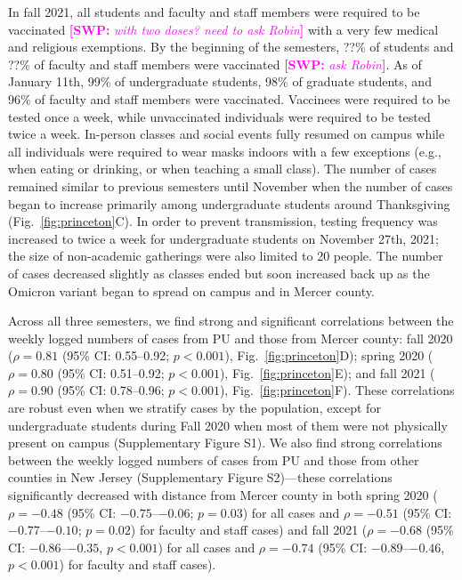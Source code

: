 \documentclass[12pt]{article}
\newcommand{\fref}[1]{Fig.~\ref{fig:#1}}
\newcommand{\comment}[3]{\textcolor{#1}{\textbf{[#2: }\textsl{#3}\textbf{]}}}
\newcommand{\swp}[1]{\comment{magenta}{SWP}{#1}}
\begin{document}
In fall 2021, all students and faculty and staff members were required to be vaccinated \swp{with two doses? need to ask Robin} with a very few medical and religious exemptions.
By the beginning of the semesters, ??\% of students and ??\% of faculty and staff members were vaccinated \swp{ask Robin}.
As of January 11th, 99\% of undergraduate students, 98\% of graduate students, and 96\% of faculty and staff members were vaccinated.
Vaccinees were required to be tested once a week, while unvaccinated individuals were required to be tested twice a week.
In-person classes and social events fully resumed on campus while all individuals were required to wear masks indoors with a few exceptions (e.g., when eating or drinking, or when teaching a small class).
The number of cases remained similar to previous semesters until November when the number of cases began to increase primarily among undergraduate students around Thanksgiving (\fref{princeton}C).  
In order to prevent transmission, testing frequency was increased to twice a week for undergraduate students on November 27th, 2021; the size of non-academic gatherings were also limited to 20 people.
The number of cases decreased slightly as classes ended but soon increased back up as the Omicron variant began to spread on campus and in Mercer county.

Across all three semesters, we find strong and significant correlations between the weekly logged numbers of cases from PU and those from Mercer county:
fall 2020 ($\rho = 0.81$ (95\% CI: 0.55--0.92; $p < 0.001$), \fref{princeton}D); spring 2020 ($\rho = 0.80$ (95\% CI: 0.51--0.92; $p < 0.001$), \fref{princeton}E); and fall 2021 ($\rho = 0.90$ (95\% CI: 0.78--0.96; $p < 0.001$), \fref{princeton}F). 
These correlations are robust even when we stratify cases by the population, except for undergraduate students during Fall 2020 when most of them were not physically present on campus (Supplementary Figure S1).
We also find strong correlations between the weekly logged numbers of cases from PU and those from other counties in New Jersey (Supplementary Figure S2)---these correlations significantly decreased with distance from Mercer county in both spring 2020 ($\rho=-0.48$ (95\% CI: $-0.75$--$-0.06$; $p = 0.03$) for all cases and $\rho=-0.51$ (95\% CI: $-0.77$--$-0.10$; $p = 0.02$) for faculty and staff cases) and fall 2021 ($\rho=-0.68$ (95\% CI: $-0.86$--$-0.35$, $p < 0.001$) for all cases and $\rho=-0.74$ (95\% CI: $-0.89$--$-0.46$, $p < 0.001$) for faculty and staff cases).
\end{document}
